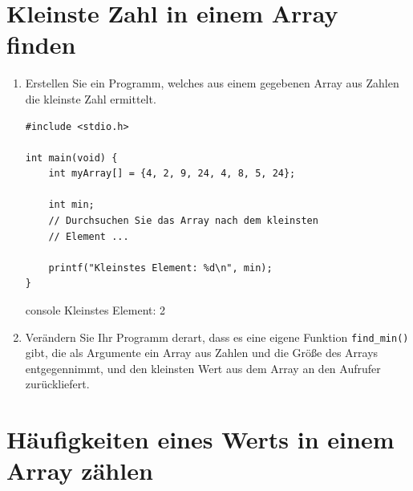 \chapter{Kleinste Zahl in einem Array finden}


\begin{enumerate}
  \item Erstellen Sie ein Programm, welches aus einem gegebenen Array aus
  Zahlen die kleinste Zahl ermittelt.

\Vorlage
\begin{verbatim}
#include <stdio.h>

int main(void) {
    int myArray[] = {4, 2, 9, 24, 4, 8, 5, 24};

    int min;
    // Durchsuchen Sie das Array nach dem kleinsten
    // Element ...

    printf("Kleinstes Element: %d\n", min);
}
\end{verbatim}

\begin{mybox}[Bildschirmausgabe]{console}
Kleinstes Element: 2
\end{mybox}

\item Verändern Sie Ihr Programm derart, dass es eine eigene Funktion
\texttt{find_min()} gibt, die als Argumente ein Array aus Zahlen und die
Größe des Arrays entgegennimmt, und den kleinsten Wert aus dem Array an den
Aufrufer zurückliefert.
\end{enumerate}




\chapter{Häufigkeiten eines Werts in einem Array zählen}


